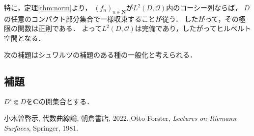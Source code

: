 \documentclass[12pt, a4paper, dvipdfmx]{jsarticle}
\theoremstyle{definition}
\newcommand{\nn}{\mathbf{N}}
\newcommand{\cc}{\mathbf{C}}
\newcommand{\mcal}{\mathcal}
\newcommand{\OO}{\mcal{O}}
\theoremstyle{mystyle}
\numberwithin{equation}{section} %
\begin{document}
特に，定理\ref{thm:norm}より，
$(f_n)_{n\in\nn}$が$L^2(D,\OO)$内のコーシー列ならば，
$D$の任意のコンパクト部分集合で一様収束することが従う．
したがって，その極限の関数は正則である．
よって$L^2(D,\OO)$は完備であり，したがってヒルベルト空間となる．

次の補題はシュワルツの補題のある種の一般化と考えられる．

\subsection{補題}
$D'\Subset D$を$\cc$の開集合とする．


\begin{thebibliography}{20} 
   小木曽啓示, 代数曲線論, 朝倉書店, 2022.
   Otto Forster, \emph{Lectures on Riemann Surfaces}, Springer, 1981.
\end{thebibliography}
\end{document}
